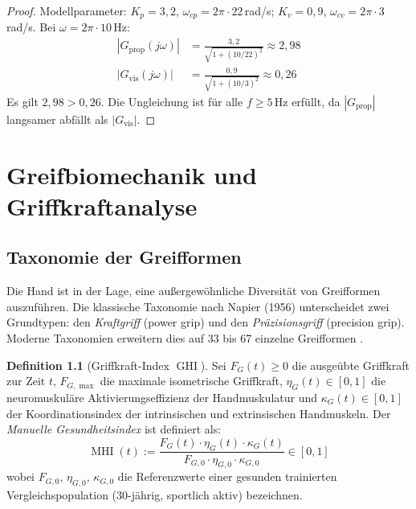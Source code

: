 ﻿\documentclass[12pt,a4paper]{report}
\theoremstyle{plain}
\theoremstyle{definition}
\newtheorem{definition}[theorem]{Definition}
\theoremstyle{remark}
\DeclareMathOperator{\MHI}{MHI}
\DeclareMathOperator{\GHI}{GHI}
\begin{document}
\begin{proof}
Modellparameter: $K_p = 3{,}2$, $\omega_{cp} = 2\pi \cdot 22$\,rad/s;
$K_v = 0{,}9$, $\omega_{cv} = 2\pi \cdot 3$\,rad/s. Bei $\omega = 2\pi \cdot 10$\,Hz:
\begin{align*}
  |G_{\text{prop}}(j\omega)| &= \frac{3{,}2}{\sqrt{1 + (10/22)^2}} \approx 2{,}98\\
  |G_{\text{vis}}(j\omega)|  &= \frac{0{,}9}{\sqrt{1 + (10/3)^2}}  \approx 0{,}26
\end{align*}
Es gilt $2{,}98 > 0{,}26$. Die Ungleichung ist für alle $f \geq 5$\,Hz erfüllt,
da $|G_{\text{prop}}|$ langsamer abfällt als $|G_{\text{vis}}|$.
\end{proof}

\chapter{Greifbiomechanik und Griffkraftanalyse}
\label{chap:greif}

\section{Taxonomie der Greifformen}

Die Hand ist in der Lage, eine außergewöhnliche Diversität von Greifformen
auszuführen. Die klassische Taxonomie nach Napier (1956) unterscheidet zwei
Grundtypen: den \emph{Kraftgriff} (power grip) und den \emph{Präzisionsgriff}
(precision grip). Moderne Taxonomien erweitern dies auf 33 bis 67 einzelne
Greifformen \cite{feix2016}.

\begin{definition}[Griffkraft-Index $\GHI$]
\label{def:ghi}
Sei $F_G(t) \geq 0$ die ausgeübte Griffkraft zur Zeit $t$,
$F_{G,\max}$ die maximale isometrische Griffkraft,
$\eta_G(t) \in [0,1]$ die neuromuskuläre Aktivierungseffizienz der
Handmuskulatur und $\kappa_G(t) \in [0,1]$ der Koordinationsindex der
intrinsischen und extrinsischen Handmuskeln. Der
\emph{Manuelle Gesundheitsindex} ist definiert als:
\[
  \MHI(t) := \frac{F_G(t) \cdot \eta_G(t) \cdot \kappa_G(t)}{F_{G,0} \cdot \eta_{G,0} \cdot \kappa_{G,0}}
  \in [0,1]
\]
wobei $F_{G,0},\, \eta_{G,0},\, \kappa_{G,0}$ die Referenzwerte einer gesunden
trainierten Vergleichspopulation (30-jährig, sportlich aktiv) bezeichnen.
\end{definition}
\end{document}
